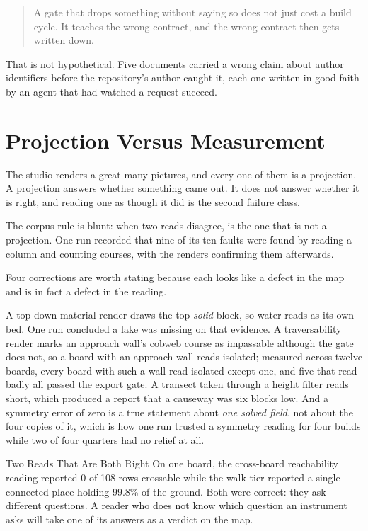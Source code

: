 \begin{quote}
A gate that drops something without saying so does not just cost a build cycle. It
teaches the wrong contract, and the wrong contract then gets written down.
\end{quote}

That is not hypothetical. Five documents carried a wrong claim about author
identifiers before the repository's author caught it, each one written in good
faith by an agent that had watched a request succeed.

\section{Projection Versus Measurement}

The studio renders a great many pictures, and every one of them is a projection.
A projection answers whether something came out. It does not answer whether it is
right, and reading one as though it did is the second failure class.

The corpus rule is blunt: when two reads disagree,  is the one that
is not a projection. One run recorded that nine of its ten faults were found by
reading a column and counting courses, with the renders confirming them
afterwards.

Four corrections are worth stating because each looks like a defect in the map and
is in fact a defect in the reading.

A top-down material render draws the top \emph{solid} block, so water reads as its
own bed. One run concluded a lake was missing on that evidence. A traversability
render marks an approach wall's cobweb course as impassable although the gate does
not, so a board with an approach wall reads isolated; measured across twelve
boards, every board with such a wall read isolated except one, and five that read
badly all passed the export gate. A transect taken through a height filter reads
short, which produced a report that a causeway was six blocks low. And a symmetry
error of zero is a true statement about \emph{one solved field}, not about the four
copies of it, which is how one run trusted a symmetry reading for four builds while
two of four quarters had no relief at all.

\begin{ruling}{Two Reads That Are Both Right}
On one board, the cross-board reachability reading reported 0 of 108 rows
crossable while the walk tier reported a single connected place holding 99.8\% of
the ground. Both were correct: they ask different questions. A reader who does not
know which question an instrument asks will take one of its answers as a verdict on
the map.
\end{ruling}

